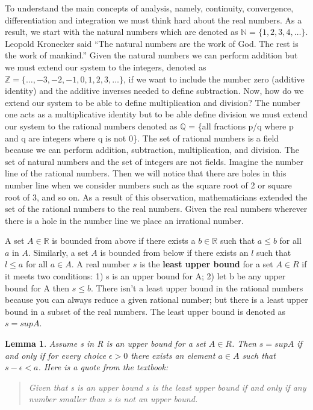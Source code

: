 \documentclass[10pt]{article}
\newtheorem{lemma}[theorem]{Lemma}
\begin{document}
To understand the main concepts of analysis, namely, continuity, convergence, differentiation and integration we must think hard about the real numbers. As a result, we start with the natural numbers which are denoted as $\mathbb{N} = \{ 1,2,3,4, \dots \}$. Leopold Kronecker said “The natural numbers are the work of God. The rest is the work of mankind.” Given the natural numbers we can perform addition but we must extend our system to the integers, denoted as $\mathbb{Z} = \{\dots,-3,-2,-1,0,1,2,3, \dots \}$, if we want to include the number zero (additive identity) and the additive inverses needed to define subtraction. Now, how do we extend our system to be able to define multiplication and division? The number one acts as a multiplicative identity but to be able define division we must extend our system to the rational numbers denoted as  $\mathbb{Q}$ = \{all fractions p/q where p and q are integers where q is not 0\}. The set of rational numbers is a field because we can perform addition, subtraction, multiplication, and division. The set of natural numbers and the set of integers are not fields. Imagine the number line of the rational numbers. Then we will notice that there are holes in this number line when we consider numbers such as the square root of 2 or square root of 3, and so on. As a result of this observation, mathematicians extended the set of the rational numbers to the real numbers. Given the real numbers wherever there is a hole in the number line we place an irrational number.

A set $A \in \mathbb{R}$ is bounded from above if there exists a  $b \in \mathbb{R}$ such that $a \le b$ for all $a$ in $A$. Similarly, a set $A$ is bounded from below if there exists an $l$ such that $l \le a$ for all $a \in A$. A real number $s$ is the \textbf{least upper bound} for a set $A \in R$ if it meets two conditions: 1) s is an upper bound for A; 2) let b be any upper bound for A then $s \le b$. There isn’t a least upper bound in the rational numbers because you can always reduce a given rational number; but there is a least upper bound in a subset of the real numbers. The least upper bound is denoted as $s = sup A$.

\begin{lemma}
    Assume s in R is an upper bound for a set $A \in R$. Then $s = sup A$ if and only if for  every choice $\epsilon > 0$ there exists an element $a \in A$ such that $s - \epsilon < a$. Here is a quote from the textbook:
    \begin{quote}
    Given that s is an upper bound s is the least upper bound if and only if any number smaller than s is not  an upper bound.
    \end{quote}
\end{lemma}
\end{document}

